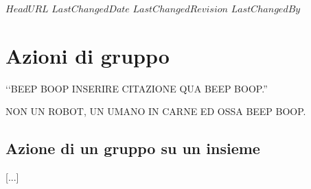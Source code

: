 \svnidlong
{$HeadURL$}
{$LastChangedDate$}
{$LastChangedRevision$}
{$LastChangedBy$}

\chapter{Azioni di gruppo}

\begin{introduction}
‘‘BEEP BOOP INSERIRE CITAZIONE QUA BEEP BOOP.''
\begin{flushright}
	\textsc{NON UN ROBOT,} UN UMANO IN CARNE ED OSSA BEEP BOOP.
\end{flushright}
\end{introduction}

\section{Azione di un gruppo su un insieme}
\begin{center}
	[...]
\end{center}
